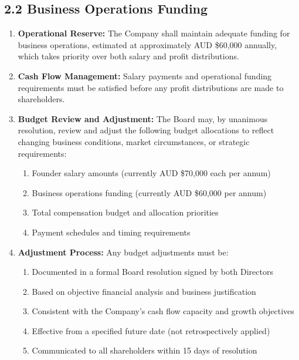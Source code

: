 \subsection*{2.2 Business Operations Funding}
\begin{enumerate}[label=\arabic*.]
\item \textbf{Operational Reserve:} The Company shall maintain adequate funding for business operations, estimated at approximately AUD \$60,000 annually, which takes priority over both salary and profit distributions.

\item \textbf{Cash Flow Management:} Salary payments and operational funding requirements must be satisfied before any profit distributions are made to shareholders.

\item \textbf{Budget Review and Adjustment:} The Board may, by unanimous resolution, review and adjust the following budget allocations to reflect changing business conditions, market circumstances, or strategic requirements:
    \begin{enumerate}[label=(\alph*)]
    \item Founder salary amounts (currently AUD \$70,000 each per annum)
    \item Business operations funding (currently AUD \$60,000 per annum)
    \item Total compensation budget and allocation priorities
    \item Payment schedules and timing requirements
    \end{enumerate}

\item \textbf{Adjustment Process:} Any budget adjustments must be:
    \begin{enumerate}[label=(\alph*)]
    \item Documented in a formal Board resolution signed by both Directors
    \item Based on objective financial analysis and business justification
    \item Consistent with the Company's cash flow capacity and growth objectives
    \item Effective from a specified future date (not retrospectively applied)
    \item Communicated to all shareholders within 15 days of resolution
    \end{enumerate}
\end{enumerate}


